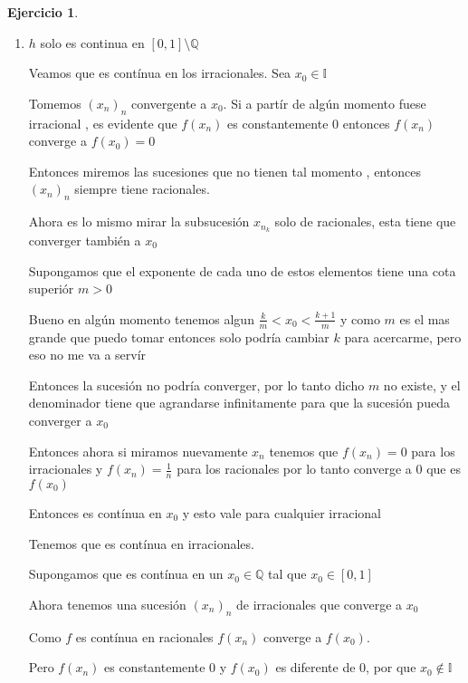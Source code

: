 \documentclass[11pt]{report}
\newcommand{\Q}{\mathbb{Q}}
\newcommand{\I}{\mathbb{I}}
\theoremstyle{definition}
\newtheorem{ej}{Ejercicio}
\begin{document}
\begin{ej}
\begin{enumerate}
\begin{proof}
					Tenemos que $g(x_n) = 0 $ por lo tanto $f(x_n)$ converge a $0$ pero $g(x) = x \neq 0$

					Entonces $g(x_n)$ no converge a $g(x)$, por lo tanto $g$ no es continua en $\Q \setminus \{0\}$

					Hacemos lo mismo con un $x_0 \in \I$ , hay una sucesión de racional convergiendo a él, cuando le aplicamos $g$ nos queda constantemente 1, por lo tanto converge a 1 , pero $g(x_0) = 0$

					Entonces $g(x_n)$ no converge a $g(x_0)$, por lo tanto $g$ no es continua en $\I \setminus \{0\}$

					Entonce $g $ es continua únicamente en el 0

				\end{proof}
				
			\item $h$ solo es continua en $[0,1] \setminus \Q$
				
				Veamos que es contínua en los irracionales. Sea $x_0 \in \I$

				Tomemos $(x_n)_n$ convergente a $x_0$. Si a partír de algún momento fuese irracional , es evidente que $f(x_n)$ es constantemente 0 entonces $f(x_n)$ converge a $f(x_0) = 0$

				Entonces miremos las sucesiones que no tienen tal momento , entonces $(x_n)_n$ siempre tiene racionales.

				Ahora es lo mismo mirar la subsucesión $x_{n_k} $ solo de racionales, esta tiene que converger también a $x_0$

				Supongamos que el exponente de cada uno de estos elementos tiene una cota superiór $m>0$

				Bueno en algún momento tenemos algun $\frac{k}{m} < x_0 < \frac{k+1}{m}$ y como $m$ es el mas grande que puedo tomar entonces solo podría cambiar $k$ para acercarme, pero eso no me va a servír 

				Entonces la sucesión no podría converger, por lo tanto dicho $m$ no existe, y el denominador tiene que agrandarse infinitamente para que la sucesión pueda converger a $x_0$

				Entonces ahora si miramos nuevamente $x_n$ tenemos que $f(x_n) = 0$ para los irracionales y $f(x_n) = \frac{1}{n}$ para los racionales por lo tanto converge a $0$ que es $f(x_0)$

				Entonces es contínua en $x_0$ y esto vale para cualquier irracional

				Tenemos que es contínua en irracionales. 

				Supongamos que es contínua en un $x_0 \in \Q$ tal que $x_0 \in [0,1]$

				Ahora tenemos una sucesión $(x_n)_n$ de irracionales que converge a $x_0$

				Como $f$ es contínua en racionales  $f(x_n)$ converge a $f(x_0)$. 

				Pero $f(x_n)$ es constantemente 0 y $f(x_0)$  es diferente de 0, por que $x_0 \notin \I$

		\end{enumerate}



		\end{ej}
\end{document}

